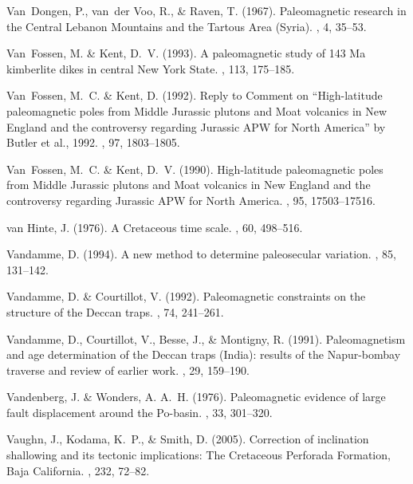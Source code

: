 \documentclass[11pt]{book}
\begin{document}
\begin{thebibliography}{}
Van~Dongen, P., van~der Voo, R., \& Raven, T. (1967).
\newblock Paleomagnetic research in the Central Lebanon Mountains and the
  Tartous Area (Syria).
, 4, 35--53.

Van~Fossen, M. \& Kent, D.~V. (1993).
\newblock A paleomagnetic study of 143 Ma kimberlite dikes in central New York
  State.
, 113, 175--185.

Van~Fossen, M.~C. \& Kent, D. (1992).
\newblock Reply to Comment on ``High-latitude paleomagnetic poles from Middle
  Jurassic plutons and Moat volcanics in New England and the controversy
  regarding Jurassic {APW} for North America'' by Butler et al., 1992.
, 97, 1803--1805.

Van~Fossen, M.~C. \& Kent, D.~V. (1990).
\newblock High-latitude paleomagnetic poles from Middle Jurassic plutons and
  Moat volcanics in New England and the controversy regarding Jurassic {APW}
  for North America.
, 95, 17503--17516.

van Hinte, J. (1976).
\newblock A Cretaceous time scale.
, 60, 498--516.

Vandamme, D. (1994).
\newblock A new method to determine paleosecular variation.
, 85, 131--142.

Vandamme, D. \& Courtillot, V. (1992).
\newblock Paleomagnetic constraints on the structure of the Deccan traps.
, 74, 241--261.

Vandamme, D., Courtillot, V., Besse, J., \& Montigny, R. (1991).
\newblock Paleomagnetism and age determination of the Deccan traps (India):
  results of the Napur-bombay traverse and review of earlier work.
, 29, 159--190.

Vandenberg, J. \& Wonders, A. A.~H. (1976).
\newblock Paleomagnetic evidence of large fault displacement around the
  Po-basin.
, 33, 301--320.

Vaughn, J., Kodama, K.~P., \& Smith, D. (2005).
\newblock Correction of inclination shallowing and its tectonic implications:
  The Cretaceous Perforada Formation, Baja California.
, 232, 72--82.


\end{thebibliography}
\end{document}
